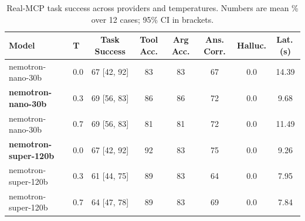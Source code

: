 \begin{table}[t]
\centering
\small
\caption{Real-MCP task success across providers and temperatures. Numbers are mean \% over 12 cases; 95\% CI in brackets.}
\label{tab:mcp_bench}
\begin{tabular}{llcccccc}
\toprule
Model & T & Task Success & Tool Acc. & Arg Acc. & Ans. Corr. & Halluc. & Lat.\,(s) \\
\midrule
nemotron-nano-30b & 0.0 & 67 [42, 92] & 83 & 83 & 67 & 0.0 & 14.39 \\
\textbf{nemotron-nano-30b} & 0.3 & 69 [56, 83] & 86 & 86 & 72 & 0.0 & 9.68 \\
nemotron-nano-30b & 0.7 & 69 [56, 83] & 81 & 81 & 72 & 0.0 & 11.49 \\
\textbf{nemotron-super-120b} & 0.0 & 67 [42, 92] & 92 & 83 & 75 & 0.0 & 9.26 \\
nemotron-super-120b & 0.3 & 61 [44, 75] & 89 & 83 & 64 & 0.0 & 7.95 \\
nemotron-super-120b & 0.7 & 64 [47, 78] & 89 & 83 & 69 & 0.0 & 7.84 \\
\bottomrule
\end{tabular}
\end{table}